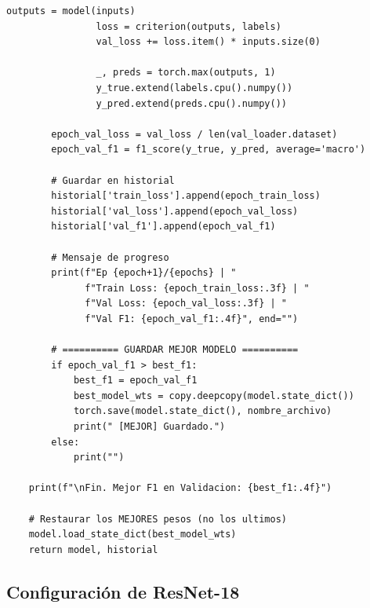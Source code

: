 \documentclass[12pt,a4paper]{article}
\begin{document}
\begin{lstlisting}[caption={Loop de entrenamiento con todas las mejoras}]
                outputs = model(inputs)
                loss = criterion(outputs, labels)
                val_loss += loss.item() * inputs.size(0)

                _, preds = torch.max(outputs, 1)
                y_true.extend(labels.cpu().numpy())
                y_pred.extend(preds.cpu().numpy())

        epoch_val_loss = val_loss / len(val_loader.dataset)
        epoch_val_f1 = f1_score(y_true, y_pred, average='macro')

        # Guardar en historial
        historial['train_loss'].append(epoch_train_loss)
        historial['val_loss'].append(epoch_val_loss)
        historial['val_f1'].append(epoch_val_f1)

        # Mensaje de progreso
        print(f"Ep {epoch+1}/{epochs} | "
              f"Train Loss: {epoch_train_loss:.3f} | "
              f"Val Loss: {epoch_val_loss:.3f} | "
              f"Val F1: {epoch_val_f1:.4f}", end="")

        # ========== GUARDAR MEJOR MODELO ==========
        if epoch_val_f1 > best_f1:
            best_f1 = epoch_val_f1
            best_model_wts = copy.deepcopy(model.state_dict())
            torch.save(model.state_dict(), nombre_archivo)
            print(" [MEJOR] Guardado.")
        else:
            print("")

    print(f"\nFin. Mejor F1 en Validacion: {best_f1:.4f}")

    # Restaurar los MEJORES pesos (no los ultimos)
    model.load_state_dict(best_model_wts)
    return model, historial
\end{lstlisting}

\subsection{Configuración de ResNet-18}
\end{document}
